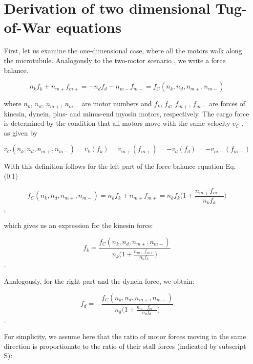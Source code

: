 \section{Derivation of two dimensional Tug-of-War equations}
\label{appendix:2DTugOfWar}

First, let us examine the one-dimensional case, where all the motors walk along the microtubule. Analogously to the two-motor scenario  \cite{gennerich2007force, muller2008tug, norstrom2010unconventional}, we write a force balance.

\begin{equation}
n_kf_k + n_{m+}f_{m+} = -n_df_d - n_{m-}f_{m-} = f_C(n_k, n_d, n_{m+}, n_{m-})
\end{equation}

where $n_k$, $n_d$, $n_{m+}$, $n_{m-}$ are motor numbers and $f_k$, $f_d$, $f_{m+}$, $f_{m-}$ are forces of kinesin, dynein, plus- and minus-end myosin motors, respectively. The cargo force is determined by the condition that all motors move with the same velocity $v_C$ , as given by

\begin{equation}
v_C(n_k, n_d, n_{m+}, n_{m-}) = v_k(f_k) = v_{m+}(f_{m+}) = - v_d(f_d) = - v_{m-}(f_{m-})
\end{equation}

With this definition follows for the left part of the force balance equation Eq. (0.1)

\begin{equation}
f_C(n_k, n_d, n_{m+}, n_{m-}) = n_kf_k + n_{m+}f_{m+} = n_kf_k\big(1 + \frac{n_{m+}f_{m+}}{n_kf_{k}}\big)
\end{equation},

which gives us an expression for the kinesin force:

\begin{equation}
f_k = \frac{f_C(n_k, n_d, n_{m+}, n_{m-})}{n_k\big(1 + \frac{n_{m+}f_{m+}}{n_kf_{k}}\big)}
\end{equation}.

Analogously, for the right part and the dynein force, we obtain:

\begin{equation}
f_d = -\frac{f_C(n_k, n_d, n_{m+}, n_{m-})}{n_d\big(1 + \frac{n_{m-}f_{m-}}{n_df_{d}}\big)}
\end{equation}.

For simplicity, we assume here that the ratio of motor forces moving in the same direction is proportionate to the ratio of their stall forces (indicated by subscript S):

